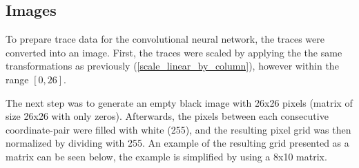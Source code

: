 \subsection{Images}

To prepare trace data for the convolutional neural network, the traces were converted into an image. First, the traces were scaled by applying the the same transformations as previously (\ref{scale_linear_by_column}), however within the range $[0, 26]$.

The next step was to generate an empty black image with 26x26 pixels (matrix of size 26x26 with only zeros). Afterwards, the pixels between each consecutive coordinate-pair were filled with white (255), and the resulting pixel grid was then normalized by dividing with 255. An example of the resulting grid presented as a matrix can be seen below, the example is simplified by using a 8x10 matrix.

